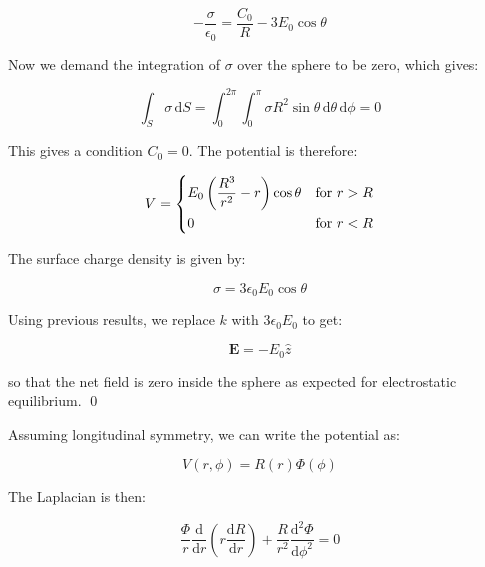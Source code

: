 \documentclass[12pt]{article}
\begin{document}
\begin{equation}
    -\frac{\sigma}{\epsilon_{0}} = \frac{C_{0}}{R} - 3E_{0} \cos{\theta}
\end{equation}

Now we demand the integration of $\sigma$ over the sphere to be zero, which gives:

\begin{equation}
    \int_{S} \sigma \, \mathrm{d}S = \int_{0}^{2\pi} \int_{0}^{\pi} \sigma R^{2} \sin{\theta} \, \mathrm{d}\theta \, \mathrm{d}\phi = 0
\end{equation}

This gives a condition $C_{0} = 0$. The potential is therefore:

\begin{equation}
    V =
    \begin{dcases}
        E_{0} \left( \frac{R^{3}}{r^{2}} - r \right) \cos{\theta} & \text{for } r > R \\
        0                                                         & \text{for } r < R
    \end{dcases}
\end{equation}

The surface charge density is given by:

\begin{equation}
    \sigma = 3\epsilon_{0} E_{0} \cos{\theta}
\end{equation}

Using previous results, we replace $k$ with $3\epsilon_{0} E_{0}$ to get:

\begin{equation}
    \mathbf{E} = -E_{0} \hat{z}
\end{equation}

so that the net field is zero inside the sphere as expected for electrostatic equilibrium.
\qed



Assuming longitudinal symmetry, we can write the potential as:

\begin{equation}
    V(r, \phi) = R(r) \Phi(\phi)
\end{equation}

The Laplacian is then:

\begin{equation}
    \frac{\Phi}{r} \frac{\mathrm{d}}{\mathrm{d}r} \left( r \frac{\mathrm{d}R}{\mathrm{d}r} \right) + \frac{R}{r^{2}} \frac{\mathrm{d}^{2}\Phi}{\mathrm{d}\phi^{2}} = 0
\end{equation}
\end{document}
